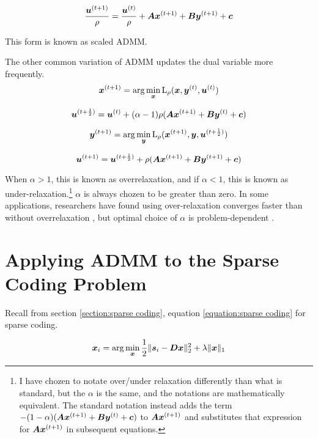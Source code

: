 \begin{equation}
\frac{\bm{u}^{(t + 1)}}{\rho} = \frac{\bm{u}^{(t)}}{\rho} + \bm{A}\bm{x}^{(t + 1)} + \bm{B}\bm{y}^{(t + 1)} + \bm{c}
\end{equation}

This form is known as scaled ADMM.

The other common variation of ADMM updates the dual variable more frequently.
\begin{equation}
\bm{x}^{(t + 1)} = \arg\min_{\bm{x}} \operatorname{L}_{\rho}(\bm{x},\bm{y}^{(t)},\bm{u}^{(t)})
\end{equation}

\begin{equation}
\bm{u}^{(t + \frac{1}{2})} = \bm{u}^{(t)} + (\alpha - 1)\rho(\bm{A}\bm{x}^{(t + 1)} + \bm{B}\bm{y}^{(t)} + \bm{c})
\end{equation}

\begin{equation}
\bm{y}^{(t + 1)} = \arg\min_{\bm{y}} \operatorname{L}_{\rho}(\bm{x}^{(t + 1)},\bm{y},\bm{u}^{(t + \frac{1}{2})})
\end{equation}

\begin{equation}
\bm{u}^{(t + 1)} = \bm{u}^{(t + \frac{1}{2})} + \rho(\bm{A}\bm{x}^{(t + 1)} + \bm{B}\bm{y}^{(t + 1)} + \bm{c})
\end{equation}

When $\alpha > 1$, this is known as overrelaxation, and if $\alpha < 1$, this is known as under-relaxation.\footnote{I have chozen to notate over/under relaxation differently than what is standard, but the $\alpha$ is the same, and the notations are mathematically equivalent. The standard notation instead adds the term $-(1 - \alpha)(\bm{A}\bm{x}^{(t + 1)} + \bm{B}\bm{y}^{(t)} + \bm{c})$ to $\bm{A}\bm{x}^{(t + 1)}$ and substitutes that expression for $\bm{A}\bm{x}^{(t + 1)}$ in subsequent equations.} $\alpha$ is always chozen to be greater than zero. In some applications, researchers have found using over-relaxation converges faster than without overrelaxation \cite{eckstein1994parallel}, but optimal choice of $\alpha$ is problem-dependent \cite{nishihara2015general}.


\section{Applying ADMM to the Sparse Coding Problem}
\label{section:Applying ADMM}
Recall from section \ref{section:sparse coding}, equation \ref{equation:sparse coding} for sparse coding.

\begin{equation}
\bm{x}_i = \arg\min_{\bm{x}} \frac{1}{2}\|\bm{s}_i - \bm{D}\bm{x}\|_2^2 + \lambda \|\bm{x}\|_1
\end{equation}

